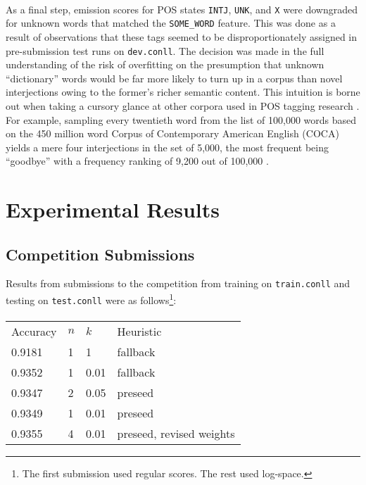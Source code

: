 \documentclass[11pt,a4paper]{article}
\begin{document}
\paragraph{}
As a final step, emission scores for POS states \texttt{INTJ}, \texttt{UNK},
and \texttt{X} were downgraded for unknown words that matched the \texttt{SOME\_WORD}
feature. This was done as a result of observations that these tags seemed to be
disproportionately assigned in pre-submission test runs on \texttt{dev.conll}.
The decision was made in the full understanding of the risk of overfitting on the
presumption that unknown ``dictionary'' words would be far more likely to turn up
in a corpus than novel interjections owing to the former's richer semantic content.
This intuition is borne out when taking a cursory glance at other corpora \cite{WFD100K}
used in POS tagging research \cite{CLAWS7} \cite{BrysbaertNewKeuleers}. For example,
sampling every twentieth word from the list of 100,000 words based on the 450 million word
Corpus of Contemporary American English (COCA) yields a mere four interjections in the set of
5,000, the most frequent being ``goodbye'' with a frequency ranking of 9,200 out of 100,000 \cite{COCA5K}.

\section{Experimental Results}

\subsection{Competition Submissions}
Results from submissions to the competition from training on \texttt{train.conll}
and testing on \texttt{test.conll} were as follows\footnote{The first submission used regular scores.  The rest used log-space.}:

\paragraph{}
{\small
\begin{tabular}{llll}
  Accuracy & $n$ & $k$ & Heuristic \\
  0.9181 & 1 & 1 & fallback \\
  0.9352 & 1 & 0.01 & fallback \\
  0.9347 & 2 & 0.05 & preseed \\
  0.9349 & 1 & 0.01 & preseed \\
  0.9355 & 4 & 0.01 & preseed, revised weights
\end{tabular}}
\end{document}
